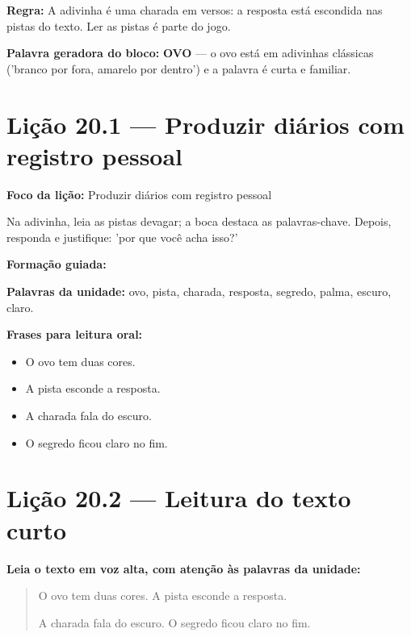\textbf{Regra:} A adivinha é uma charada em versos: a resposta está escondida nas pistas do texto. Ler as pistas é parte do jogo.

\textbf{Palavra geradora do bloco:} \textbf{OVO} --- o ovo está em adivinhas clássicas ('branco por fora, amarelo por dentro') e a palavra é curta e familiar.

\section{Lição 20.1 --- Produzir diários com registro pessoal}

\textbf{Foco da lição:} Produzir diários com registro pessoal


\begin{boquinha}
Na adivinha, leia as pistas devagar; a boca destaca as palavras-chave. Depois, responda e justifique: 'por que você acha isso?'
\end{boquinha}

\noindent\textbf{Formação guiada:}

\begin{center}
\end{center}

\noindent\textbf{Palavras da unidade:} ovo, pista, charada, resposta, segredo, palma, escuro, claro.

\noindent\textbf{Frases para leitura oral:}
\begin{itemize}[leftmargin=1.6em]
  \item O ovo tem duas cores.
  \item A pista esconde a resposta.
  \item A charada fala do escuro.
  \item O segredo ficou claro no fim.
\end{itemize}

\section{Lição 20.2 --- Leitura do texto curto}

\noindent\textbf{Leia o texto em voz alta, com atenção às palavras da unidade:}


\begin{quote}
O ovo tem duas cores. A pista esconde a resposta.

A charada fala do escuro. O segredo ficou claro no fim.
\end{quote}

